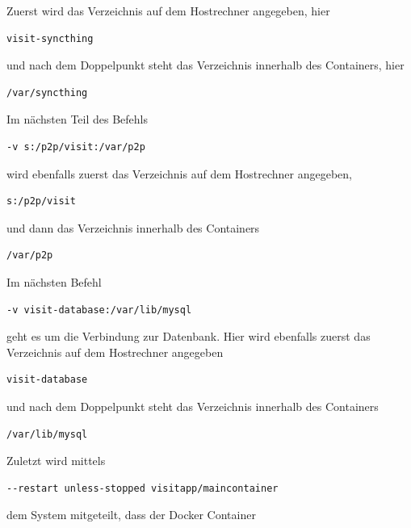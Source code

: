 Zuerst wird das Verzeichnis auf dem Hostrechner angegeben, hier \begin{lstlisting}[style=MyBashStyle, caption={visit-syncthing}]
visit-syncthing
\end{lstlisting}
und nach dem Doppelpunkt steht das Verzeichnis innerhalb des Containers, hier \begin{lstlisting}[style=MyBashStyle, caption={Angabe des Verzeichnisses innerhalb des Containers}]
/var/syncthing
\end{lstlisting}

Im nächsten Teil des Befehls \begin{lstlisting}[style=MyBashStyle, caption={Angabe des Verzeichnisses auf dem Hostrechner}]
-v s:/p2p/visit:/var/p2p
\end{lstlisting}

 wird ebenfalls zuerst das Verzeichnis auf dem Hostrechner angegeben, 
 
 \begin{lstlisting}[style=MyBashStyle, caption={Angabe des Verzeichnisses innerhalb des Hostrechners}]
s:/p2p/visit
\end{lstlisting} und dann das Verzeichnis innerhalb des Containers 

\begin{lstlisting}[style=MyBashStyle, caption={Angabe des Verzeichnisses innerhalb des Containers}]
/var/p2p
\end{lstlisting}

Im nächsten Befehl \begin{lstlisting}[style=MyBashStyle, caption={Verbindung zur Datenbank}]
-v visit-database:/var/lib/mysql
\end{lstlisting} geht es um die Verbindung zur Datenbank. Hier wird ebenfalls zuerst das Verzeichnis auf dem Hostrechner angegeben 

\begin{lstlisting}[style=MyBashStyle, caption={Angabe des Verzeichnisses auf dem Hostrechner}]
visit-database
\end{lstlisting} und nach dem Doppelpunkt steht das Verzeichnis innerhalb des Containers 

\begin{lstlisting}[style=MyBashStyle, caption={Angabe des Verzeichnisses innerhalb des Containers}]
/var/lib/mysql
\end{lstlisting}
Zuletzt wird mittels 

\begin{lstlisting}[style=MyBashStyle, caption={Automatisches Starten des Docker Containers}]
--restart unless-stopped visitapp/maincontainer
\end{lstlisting} dem System mitgeteilt, dass der Docker Container 

